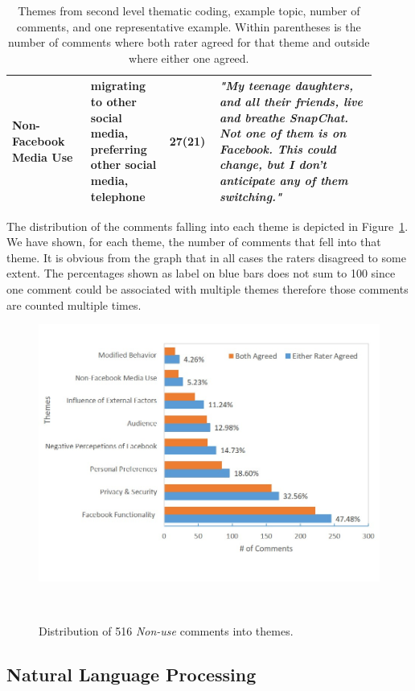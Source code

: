 \begin{table}[t!]
\begin{tabular}{p{0.20\linewidth}|p{0.2\linewidth}|p{0.1\linewidth}|p{0.4\linewidth}}
Non-Facebook Media Use & migrating to other social media, preferring other social media, telephone & 27(21) &\textit{"My teenage daughters, and all their friends, live and breathe SnapChat. Not one of them is on Facebook. This could change, but I don't anticipate any of them switching."}\\\hline
\hline
\end{tabular}
\caption{Themes from second level thematic coding, example topic, number of comments, and one representative example. Within parentheses is the number of comments where both rater agreed for that theme and outside where either one agreed.}
    \label{table:coding category}
\end{table}


The distribution of the comments falling into each theme is depicted in Figure~\ref{fig:figure1}. We have shown, for each theme, the number of comments that fell into that theme. It is obvious from the graph that in all cases the raters disagreed to some extent. The percentages shown as label on blue bars does not sum to 100 since one comment could be associated with multiple themes therefore those comments are counted multiple times.

\begin{figure}
  \centering
  \includegraphics[width=1.0\columnwidth]{figures/fig7.jpg}
  \caption{Distribution of 516 \emph{Non-use} comments into themes.}~\label{fig:figure1}
\end{figure}

\subsection{Natural Language Processing}

